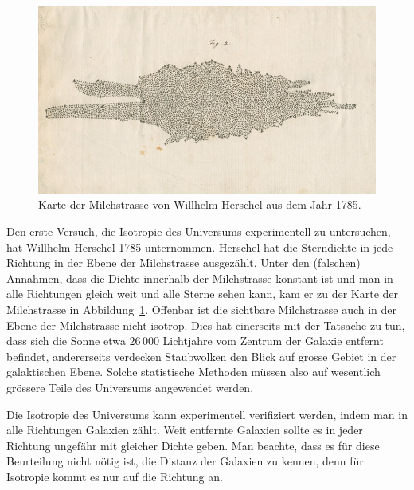 \begin{figure}
\centering
\includegraphics[width=\hsize]{chapters/images/rs-9810.jpg}
\caption{Karte der Milchstrasse von Willhelm Herschel aus dem Jahr 1785.
\label{skript:robertson:herschel}}
\end{figure}
Den erste Versuch, die Isotropie des Universums experimentell zu untersuchen,
hat Willhelm Herschel 1785 unternommen.
Herschel hat die Sterndichte in jede Richtung in der Ebene der Milchstrasse
ausgezählt.
Unter den (falschen) Annahmen, dass die Dichte innerhalb der Milchstrasse
konstant ist und man in alle Richtungen gleich weit und alle Sterne sehen
kann, kam er zu der Karte der Milchstrasse in
Abbildung~\ref{skript:robertson:herschel}.
Offenbar ist die sichtbare Milchstrasse auch in der Ebene der Milchstrasse
nicht isotrop.
Dies hat einerseits mit der Tatsache zu tun, dass sich die Sonne etwa
$26\,000$ Lichtjahre vom Zentrum der Galaxie entfernt befindet, andererseits
verdecken Staubwolken den Blick auf grosse Gebiet in der galaktischen Ebene.
Solche statistische Methoden müssen also auf wesentlich grössere Teile
des Universums angewendet werden.

Die Isotropie des Universums kann experimentell verifiziert werden,
indem man in alle Richtungen Galaxien zählt.
Weit entfernte Galaxien sollte es in jeder Richtung ungefähr mit 
gleicher Dichte geben.
Man beachte, dass es für diese Beurteilung nicht nötig ist, die
Distanz der Galaxien zu kennen, denn für Isotropie kommt es nur
auf die Richtung an.

